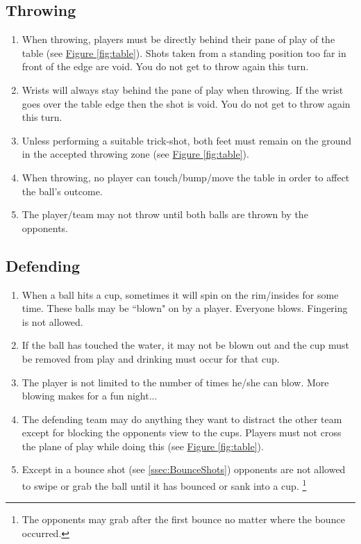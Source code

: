 	\subsection{Throwing}\label{ssec:Throwing}
        \begin{enumerate}[label=(\roman*)]
            \item \label{sssec:Throwing,stand_behind} When throwing, players must be directly behind their pane of play of the table (see \hyperref[fig:table]{Figure \ref{fig:table}}).
                Shots taken from a standing position too far in front of the edge are void. You do not get to throw again this turn. 
            \item \label{sssec:Throwing,wrists} Wrists will always stay behind the pane of play when throwing.
                If the wrist goes over the table edge then the shot is void. You do not get to throw again this turn. 
            \item \label{sssec:Throwing,feet} Unless performing a suitable trick-shot, both feet must remain on the ground in the accepted throwing zone (see \hyperref[fig:table]{Figure \ref{fig:table}}). 
            \item \label{sssec:Throwing,bumping_table} When throwing, no player can touch/bump/move the table in order to affect the ball's outcome. 
            \item \label{sssec:Throwing,possesion} The player/team may not throw until both balls are thrown by the opponents. 
        \end{enumerate}
    \subsection{Defending}\label{ssec:Defending}
		\begin{enumerate}[label=(\roman*)]
            \item \label{sssec:Defending,blowing} When a ball hits a cup, sometimes it will spin on the rim/insides for some time.
                These balls may be ``blown" on by a player.
                Everyone blows.
                Fingering is not allowed. 
            \item \label{ssec:Defending,blowing_voids} If the ball has touched the water, it may not be blown out and the cup must be removed from play and drinking must occur for that cup. 
            \item \label{sssec:Defending,blowing_times} The player is not limited to the number of times he/she can blow. More blowing makes for a fun night... 
            \item \label{sssec:Defending,pysycedout} The defending team may do anything they want to distract the other team except for blocking the opponents view to the cups.
                Players must not cross the plane of play while doing this (see \hyperref[fig:table]{Figure \ref{fig:table}}). 
            \item \label{sssec:Defending,balltouching} Except in a bounce shot (see \ref{ssec:BounceShots}) opponents are not allowed to swipe or grab the ball until it has bounced or sank into a cup. \footnote{The opponents may grab after the first bounce no matter where the bounce occurred.}
        \end{enumerate}
